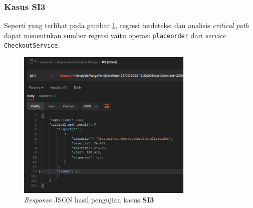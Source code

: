 \pagebreak

\subsubsection{Kasus SI3}
Seperti yang terlihat pada gambar \ref{result_json_3}, regresi terdeteksi dan analisis \textit{critical path} dapat menentukan sumber regresi yaitu operasi \texttt{placeorder} dari \textit{service} \texttt{CheckoutService}.
\begin{figure}[!htb]
	\centering
	\includegraphics[width=0.75\textwidth]{resources/ch4/json/3.png}
	\caption{\textit{Response} JSON hasil pengujian kasus \textbf{SI3}}
	\label{result_json_3}
\end{figure}


